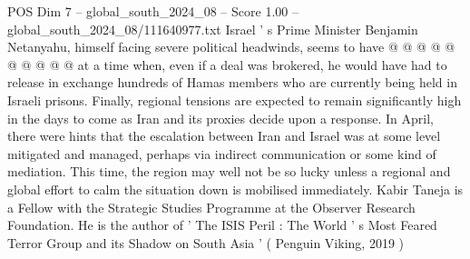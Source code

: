 \begin{textsample}{POS Dim 7 – global\_south\_2024\_08 – Score 1.00 – global\_south\_2024\_08/111640977.txt}
Israel ' s Prime Minister Benjamin Netanyahu, himself facing severe political headwinds, seems to have @ @ @ @ @ @ @ @ @ @ at a time when, even if a deal was brokered, he would have had to release in exchange hundreds of Hamas members who are currently being held in Israeli prisons.
Finally, regional tensions are expected to remain significantly high in the days to come as Iran and its proxies decide upon a response.
In April, there were hints that the escalation between Iran and Israel was at some level mitigated and managed, perhaps via indirect communication or some kind of mediation.
This time, the region may well not be so lucky unless a regional and global effort to calm the situation down is mobilised immediately.
Kabir Taneja is a Fellow with the Strategic Studies Programme at the Observer Research Foundation.
He is the author of ' The ISIS Peril : The World ' s Most Feared Terror Group and its Shadow on South Asia ' ( Penguin Viking, 2019 )

\end{textsample}
